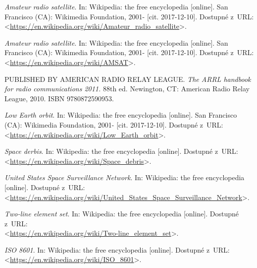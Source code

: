 

\begin{literatura}{99}

    \emph{Amateur radio satellite}. In: Wikipedia: the free encyclopedia\/ [online].
    San Francisco (CA): Wikimedia Foundation, 2001- [cit. 2017-12-10].
    Dostupné z~URL:\\
    <\url{https://en.wikipedia.org/wiki/Amateur_radio_satellite}>.

    \emph{Amateur radio satellite}. In: Wikipedia: the free encyclopedia\/ [online].
    San Francisco (CA): Wikimedia Foundation, 2001- [cit. 2017-12-10].
    Dostupné z~URL:\\
    <\url{https://en.wikipedia.org/wiki/AMSAT}>.

    PUBLISHED BY AMERICAN RADIO RELAY LEAGUE.
    \emph{The ARRL handbook for radio communications 2011.} 88th ed. Newington, CT: American Radio Relay League, 2010. ISBN 9780872590953.

    \emph{Low Earth orbit}. In: Wikipedia: the free encyclopedia\/ [online].
    San Francisco (CA): Wikimedia Foundation, 2001- [cit. 2017-12-10].
    Dostupné z~URL:\\
    <\url{https://en.wikipedia.org/wiki/Low_Earth_orbit}>.

    \emph{Space derbis}. In: Wikipedia: the free encyclopedia\/ [online].
    Dostupné z~URL:\\
    <\url{https://en.wikipedia.org/wiki/Space_debris}>.

    \emph{United States Space Surveillance Network}. In: Wikipedia: the free encyclopedia\/ [online].
    Dostupné z~URL:\\
    <\url{https://en.wikipedia.org/wiki/United_States_Space_Surveillance_Network}>.

    \emph{Two-line element set}. In: Wikipedia: the free encyclopedia\/ [online].
    Dostupné z~URL:\\
    <\url{https://en.wikipedia.org/wiki/Two-line_element_set}>.

    \emph{ISO 8601}. In: Wikipedia: the free encyclopedia\/ [online].
    Dostupné z~URL:\\
    <\url{https://en.wikipedia.org/wiki/ISO_8601}>.


\end{literatura}
